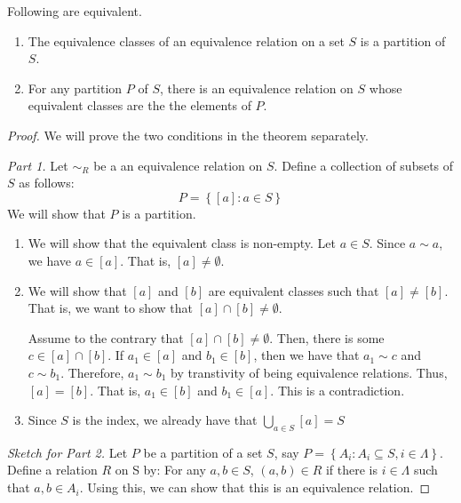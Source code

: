 \begin{theorem}
    Following are equivalent.

    \begin{enumerate}
        \item The equivalence classes of an equivalence relation on a set \(S\) is a partition of \(S\).
        \item For any partition \(P\) of \(S\), there is an equivalence relation on \(S\) whose equivalent classes are the the elements of \(P\).
    \end{enumerate}
\end{theorem}

\begin{proof}
    We will prove the two conditions in the theorem separately.

    \textit{Part 1.} Let \(\sim_R\) be a an equivalence relation on \(S\). Define a collection of subsets of \(S\) as follows:
    \[
        P = \left\{[a] : a \in S\right\}
    \]
    We will show that \(P\) is a partition.
    \begin{enumerate}
        \item We will show that the equivalent class is non-empty. Let \(a \in S\). Since \(a \sim a\), we have \(a \in [a]\). That is, \([a] \neq \emptyset\).
        \item We will show that \([a]\) and \([b]\) are equivalent classes such that \([a] \neq [b]\). That is, we want to show that \([a] \cap [b] \neq \emptyset\).

            Assume to the contrary that \([a] \cap [b] \neq \emptyset\). Then, there is some \(c \in [a] \cap [b]\). If \(a_1 \in [a]\) and \(b_1 \in [b]\), then we have that \(a_1 \sim c\) and \(c \sim b_1\). Therefore, \(a_1 \sim b_1\) by transtivity of being equivalence relations. Thus, \([a] = [b]\). That is, \(a_1 \in [b]\) and \(b_1 \in [a]\). This is a contradiction.

        \item Since \(S\) is the index, we already have that \(\bigcup_{a \in S} [a] = S\)
    \end{enumerate}

    \textit{Sketch for Part 2.} Let \(P\) be a partition of a set \(S\), say \(P = \left\{A_i : A_i \subseteq S, i \in \Lambda\right\}\). Define a relation \(R\) on S by: For any \(a, b \in S\), \((a, b) \in R\) if there is \(i \in \Lambda\) such that \(a, b \in A_i\). Using this, we can show that this is an equivalence relation.
\end{proof}
